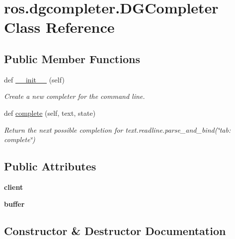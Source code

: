 \hypertarget{classros_1_1dgcompleter_1_1DGCompleter}{}\section{ros.\+dgcompleter.\+D\+G\+Completer Class Reference}
\label{classros_1_1dgcompleter_1_1DGCompleter}
\subsection*{Public Member Functions}
\begin{DoxyCompactItemize}
\item 
def \hyperlink{classros_1_1dgcompleter_1_1DGCompleter_afe3b02de52a32cdeadcefbf6baecacb2}{\+\_\+\+\_\+init\+\_\+\+\_\+} (self)
\begin{DoxyCompactList}\small\item\em Create a new completer for the command line. \end{DoxyCompactList}\item 
def \hyperlink{classros_1_1dgcompleter_1_1DGCompleter_a0662ed6ab4e56fb2a828c5577e03b41e}{complete} (self, text, state)
\begin{DoxyCompactList}\small\item\em Return the next possible completion for \textquotesingle{}text\textquotesingle{}.readline.\+parse\+\_\+and\+\_\+bind(\char`\"{}tab\+: complete\char`\"{}) \end{DoxyCompactList}\end{DoxyCompactItemize}
\subsection*{Public Attributes}
\begin{DoxyCompactItemize}
\item 
\mbox{\label{classros_1_1dgcompleter_1_1DGCompleter_afcab03fb8dcc2ed3b536d76369037cde}} 
{\bfseries client}
\item 
\mbox{\label{classros_1_1dgcompleter_1_1DGCompleter_a7e95fab5df0d74bfb1e90dc4cea6d901}} 
{\bfseries buffer}
\end{DoxyCompactItemize}


\subsection{Constructor \& Destructor Documentation}
\mbox{\label{classros_1_1dgcompleter_1_1DGCompleter_afe3b02de52a32cdeadcefbf6baecacb2}} 
